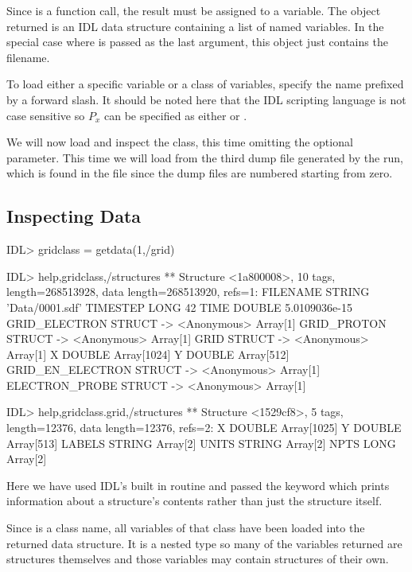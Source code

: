   Since  is a function call, the result must be assigned to a
  variable. The object returned is an IDL data structure containing a list
  of named variables. In the special case where  is passed as
  the last argument, this object just contains the filename.

  To load either a specific variable or a class of variables, specify the
  name prefixed by a forward slash. It should be noted here that the IDL
  scripting language is not case sensitive so $P_x$ can be specified as
  either  or .

  We will now load and inspect the  class, this time omitting
  the optional  parameter. This time we will load from the
  third dump file generated by the {\EPOCH} run, which is found in the
  file  since the dump files are numbered starting from zero.
%
\pagebreak
\subsection{Inspecting Data}

\begin{boxverbatim}
IDL> gridclass = getdata(1,/grid)

IDL> help,gridclass,/structures
** Structure <1a800008>, 10 tags, length=268513928, data length=268513920, refs=1:
   FILENAME        STRING    'Data/0001.sdf'
   TIMESTEP        LONG                42
   TIME            DOUBLE       5.0109036e-15
   GRID_ELECTRON   STRUCT    -> <Anonymous> Array[1]
   GRID_PROTON     STRUCT    -> <Anonymous> Array[1]
   GRID            STRUCT    -> <Anonymous> Array[1]
   X               DOUBLE    Array[1024]
   Y               DOUBLE    Array[512]
   GRID_EN_ELECTRON
                   STRUCT    -> <Anonymous> Array[1]
   ELECTRON_PROBE  STRUCT    -> <Anonymous> Array[1]

IDL> help,gridclass.grid,/structures
** Structure <1529cf8>, 5 tags, length=12376, data length=12376, refs=2:
   X               DOUBLE    Array[1025]
   Y               DOUBLE    Array[513]
   LABELS          STRING    Array[2]
   UNITS           STRING    Array[2]
   NPTS            LONG      Array[2]
\end{boxverbatim}

  Here we have used IDL's built in  routine and passed the
   keyword which prints information about a structure's
  contents rather than just the structure itself.

  Since  is a class name, all variables of that class have
  been loaded into the returned data structure. It is a nested type
  so many of the variables returned are structures themselves and those
  variables may contain structures of their own.

